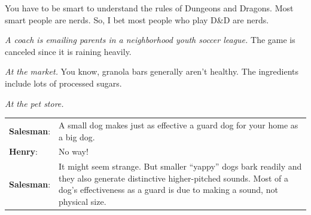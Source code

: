  
\begin{exercises}

\item You have to be smart to understand the rules of Dungeons and Dragons. Most smart people are nerds. So, I bet most people who play D\&D are nerds.


%




\item \textit{A coach is emailing parents in a neighborhood youth soccer league.} The game is canceled since it is raining heavily.


\item  \textit{At the market. }You know, granola bars generally aren't healthy. The ingredients include lots of processed sugars.

\item  \textit{At the pet store.}
\vspace{-8pt}
\begin{adjustwidth}{2em}{0em}
\begin{longtabu}{p{.1\linewidth}p{.8\linewidth}}
\textbf{Salesman}:     &A small dog makes just as effective a guard dog for your 
home as a big dog.\\
\textbf{Henry}:        &   No way!\\
\textbf{Salesman}: &    It might seem strange. But smaller ``yappy'' dogs bark readily and they also generate distinctive higher-pitched sounds. Most of a dog's effectiveness as a guard is due to making a sound, not physical size. \end{longtabu}
\end{adjustwidth}
\vspace{-.9cm}


\end{exercises}
